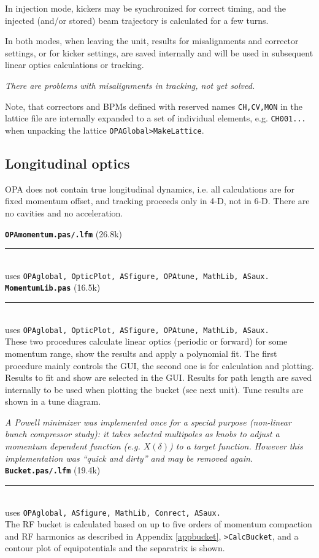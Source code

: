 \documentclass[12pt]{article}
\newcommand\code[1]{{\tt #1}}
\newcommand{\todo}[1]{{\color{red}\em #1}}
\newcommand\opamodule[3]{{\bf \tt #1} #2\\  \rule[3pt]{\textwidth}{0.2pt} \\ {\scriptsize uses \tt  #3}\\[1ex]}
\begin{document}
In injection mode, kickers may be synchronized for correct timing, and the injected (and/or stored) beam trajectory is calculated for a few turns.

In both modes, when leaving the unit, results for misalignments and corrector settings, or for kicker settings, are saved internally and will be used in subsequent linear optics calculations or tracking.

\todo{There are problems with misalignments in tracking, not yet solved.}

Note, that correctors and BPMs defined with reserved names {\tt CH,CV,MON} in the lattice file are internally expanded to a set of individual elements, e.g. {\tt CH001...} when unpacking the lattice \code{OPAGlobal>MakeLattice}.

\subsection{Longitudinal optics}
OPA does not contain true longitudinal dynamics, i.e. all calculations are for fixed momentum offset, and tracking proceeds only in 4-D, not in 6-D. There are no cavities and no acceleration.

\opamodule{OPAmomentum.pas/.lfm}{(26.8k)}{OPAglobal, OpticPlot, ASfigure, OPAtune, MathLib, ASaux.}
\opamodule{MomentumLib.pas}{(16.5k)}{OPAglobal, OpticPlot, ASfigure, OPAtune, MathLib, ASaux.}
These two procedures calculate linear optics (periodic or forward) for some momentum range, show the results and apply a polynomial fit. The first procedure mainly controls the GUI, the second one is for calculation and plotting.
Results to fit and show are selected in the GUI. Results for path length are saved internally to be used when plotting the bucket (see next unit). Tune results are shown in a tune diagram.

\todo{A Powell minimizer was implemented once for a special purpose (non-linear bunch compressor study): it takes selected multipoles as knobs to adjust a momentum dependent function (e.g. $X(\delta)$) to a target function. However this implementation was ``quick and dirty'' and may be removed again.}\\


\opamodule{Bucket.pas/.lfm}{(19.4k)}{OPAglobal, ASfigure, MathLib, Conrect, ASaux.}
The RF bucket is calculated based on up to five orders of momentum compaction and RF harmonics as described in Appendix \ref{appbucket}, \code{>CalcBucket}, and a contour plot of equipotentials and the separatrix is shown.
\end{document}

